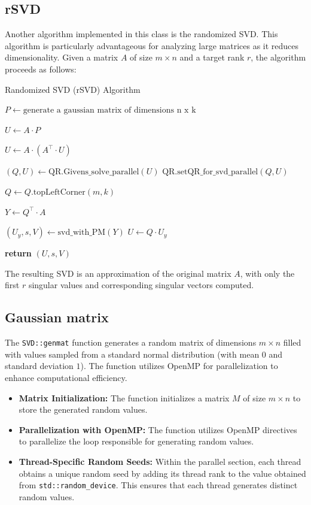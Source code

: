 \documentclass{article}
\begin{document}
\subsection{rSVD}
   Another algorithm implemented in this class is the randomized SVD. This algorithm is particularly advantageous for analyzing large matrices as it reduces dimensionality. Given a matrix \(A\) of size \(m \times n\) and a target rank \(r\), the algorithm proceeds as follows:

\begin{algorithm}
\caption{Randomized SVD (rSVD) Algorithm}
\begin{algorithmic}[1]
    \State $P \gets \text{generate a gaussian matrix of dimensions n x k}$ 
    
    \State $U \gets A \cdot P$ 

        \State $U \gets A \cdot (A^\top \cdot U)$
    \EndFor

    \State $(Q, U) \gets \text{QR.Givens\_solve\_parallel}(U)$
    \State $\text{QR.setQR\_for\_svd\_parallel}(Q, U)$

    \State $Q \gets Q.\text{topLeftCorner}(m, k)$

    \State $Y \gets Q^\top \cdot A$ 

    \State $(U_y, s, V) \gets \text{svd\_with\_PM}(Y)$
    \State $U \gets Q \cdot U_y$

    \State \textbf{return} $(U, s, V)$
\EndFunction
\end{algorithmic}
\end{algorithm}

   The resulting SVD is an approximation of the original matrix $A$, with only the first $r$ singular values and corresponding singular vectors computed.

\subsection{Gaussian matrix}
The \texttt{SVD::genmat} function generates a random matrix of dimensions $m \times n$ filled with values sampled from a standard normal distribution (with mean $0$ and standard deviation $1$). The function utilizes OpenMP for parallelization to enhance computational efficiency.

\begin{itemize}
    \item \textbf{Matrix Initialization:} The function initializes a matrix $M$ of size $m \times n$ to store the generated random values.
    
    \item \textbf{Parallelization with OpenMP:} The function utilizes OpenMP directives to parallelize the loop responsible for generating random values.
    
    \item \textbf{Thread-Specific Random Seeds:} Within the parallel section, each thread obtains a unique random seed by adding its thread rank to the value obtained from \texttt{std::random\_device}. This ensures that each thread generates distinct random values.
\end{itemize}
\end{document}
